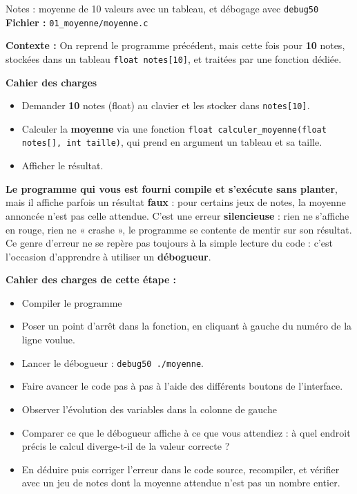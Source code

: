 \begin{UPSTIManipulation}{Notes : moyenne de 10 valeurs avec un tableau, et débogage avec \texttt{debug50}}
  \textbf{Fichier :} \texttt{01\_moyenne/moyenne.c}

  \textbf{Contexte :} On reprend le programme précédent, mais cette fois pour \textbf{10} notes, stockées dans un tableau \texttt{float notes[10]}, et traitées par une fonction dédiée.

  \textbf{Cahier des charges}
  \begin{itemize}
    \item Demander \textbf{10} notes (float) au clavier et les stocker dans \texttt{notes[10]}.
    \item Calculer la \textbf{moyenne} via une fonction \texttt{float calculer\_moyenne(float notes[], int taille)}, qui prend en argument un tableau et sa taille.
    \item Afficher le résultat.
  \end{itemize}

  \textbf{Le programme qui vous est fourni compile et s'exécute sans planter}, mais il affiche parfois un résultat \textbf{faux} : pour certains jeux de notes, la moyenne annoncée n'est pas celle attendue. C'est une erreur \textbf{silencieuse} : rien ne s'affiche en rouge, rien ne « crashe », le programme se contente de mentir sur son résultat. Ce genre d'erreur ne se repère pas toujours à la simple lecture du code : c'est l'occasion d'apprendre à utiliser un \textbf{débogueur}.

  \textbf{Cahier des charges de cette étape :}
  \begin{itemize}
    \item Compiler le programme
    \item Poser un point d'arrêt dans la fonction, en cliquant à gauche du numéro de la ligne voulue. 
    \item Lancer le débogueur : \texttt{debug50 ./moyenne}.
    \item Faire avancer le code pas à pas à l'aide des différents boutons de l'interface.  
    \item Observer l'évolution des variables dans la colonne de gauche
    \item Comparer ce que le débogueur affiche à ce que vous attendiez : à quel endroit précis le calcul diverge-t-il de la valeur correcte ?
    \item En déduire puis corriger l'erreur dans le code source, recompiler, et vérifier avec un jeu de notes dont la moyenne attendue n'est pas un nombre entier.
  \end{itemize}

\end{UPSTIManipulation}


